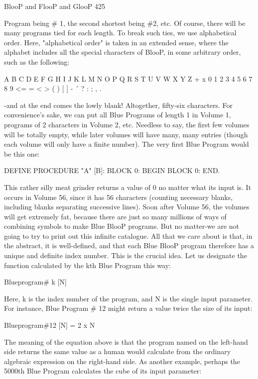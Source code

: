 BlooP and FlooP and GlooP                                                                 425

Program being \# 1, the second shortest being \#2, etc. Of course, there will be many
programs tied for each length. To break such ties, we use alphabetical order. Here,
"alphabetical order" is taken in an extended sense, where the alphabet includes all the
special characters of BlooP, in some arbitrary order, such as the following:

            A B C D E F G H I J K L M N
            O P Q R S T U V W X Y Z + x
            0 1 2 3 4 5 6 7 8 9 <= = < >
            ( ) [ ] { } - ´ ? : ; , .

-and at the end comes the lowly blank! Altogether, fifty-six characters. For convenience's
sake, we can put all Blue Programs of length 1 in Volume 1, programs of 2 characters in
Volume 2, etc. Needless to say, the first few volumes will be totally empty, while later
volumes will have many, many entries (though each volume will only have a finite
number). The very first Blue Program would be this one:

            DEFINE PROCEDURE "A" [B]:
            BLOCK 0: BEGIN
            BLOCK 0: END.

This rather silly meat grinder returns a value of 0 no matter what its input is. It occurs in
Volume 56, since it has 56 characters (counting necessary blanks, including blanks
separating successive lines).
         Soon after Volume 56, the volumes will get extremely fat, because there are just
so many millions of ways of combining symbols to make Blue BlooP programs. But no
matter-we are not going to try to print out this infinite catalogue. All that we care about is
that, in the abstract, it is well-defined, and that each Blue BlooP program therefore has a
unique and definite index number. This is the crucial idea.
         Let us designate the function calculated by the kth Blue Program this way:

                                   Blueprogram{\# k} [N]

Here, k is the index number of the program, and N is the single input parameter. For
instance, Blue Program \# 12 might return a value twice the size of its input:

                              Blueprogram{\#12} [N] = 2 x N

The meaning of the equation above is that the program named on the left-hand side
returns the same value as a human would calculate from the ordinary algebraic
expression on the right-hand side. As another example, perhaps the 5000th Blue Program
calculates the cube of its input parameter:

